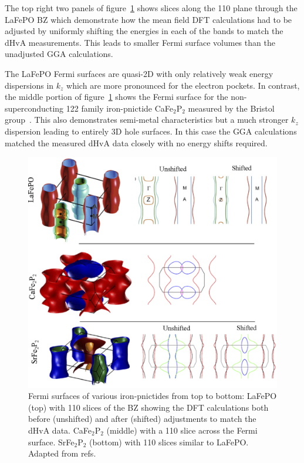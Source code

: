 The top right two panels of figure~\ref{Fig:Intro:PnictideFS} shows slices along the 110 plane through the LaFePO \ac{BZ} which demonstrate how the mean field \ac{DFT} calculations had to be adjusted by uniformly shifting the energies in each of the bands to match the \ac{dHvA} measurements. This leads to smaller Fermi surface volumes than the unadjusted \ac{GGA} calculations.

The LaFePO Fermi surfaces are quasi-2D with only relatively weak energy dispersions in $k_z$ which are more pronounced for the electron pockets. In contrast, the middle portion of figure~\ref{Fig:Intro:PnictideFS} shows the Fermi surface for the non-superconducting 122 family iron-pnictide CaFe$_2$P$_2$ measured by the Bristol group~\cite{Coldea2009}. This also demonstrates semi-metal characteristics but a much stronger $k_z$ dispersion leading to entirely 3D hole surfaces. In this case the \ac{GGA} calculations matched the measured \ac{dHvA} data closely with no energy shifts required.
\begin{figure}[htbp]
    \begin{center}
        \includegraphics[scale=0.7]{Chapter-Introduction/Figures/PnictideFS/PnictideFS}
        \caption{Fermi surfaces of various iron-pnictides from top to bottom: LaFePO (top) with 110 slices of the \ac{BZ} showing the \ac{DFT} calculations both before (unshifted) and after (shifted) adjustments to match the \ac{dHvA} data. CaFe$_2$P$_2$ (middle) with a 110 slice across the Fermi surface. SrFe$_2$P$_2$ (bottom) with 110 slices similar to LaFePO. Adapted from refs.~\cite{Carrington2009, Coldea2009, Carrington2011, Analytis2009}}
        \label{Fig:Intro:PnictideFS}
    \end{center}
\end{figure}

